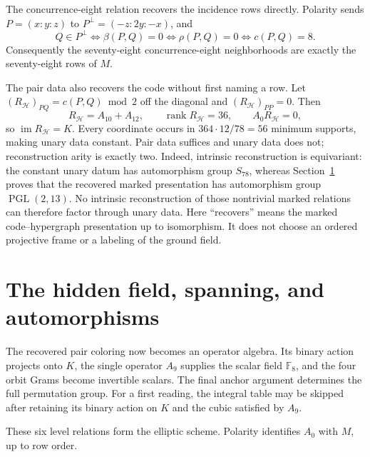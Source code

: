 \documentclass[11pt]{article}
\theoremstyle{definition}
\theoremstyle{remark}
\newcommand{\F}{\mathbb F}
\newcommand{\PGL}{\operatorname{PGL}}
\begin{document}
The concurrence-eight relation recovers the incidence rows directly.
Polarity sends
\(P=(x:y:z)\) to \(P^\perp=(-z:2y:-x)\), and
\[
 Q\in P^\perp
 \iff \beta(P,Q)=0
 \iff \rho(P,Q)=0
 \iff c(P,Q)=8.
\]
Consequently the seventy-eight concurrence-eight neighborhoods are exactly
the seventy-eight rows of \(M\).

The pair data also recovers the code without first naming a row.  Let
\((R_{\mathcal H})_{PQ}=c(P,Q)\bmod2\) off the diagonal and
\((R_{\mathcal H})_{PP}=0\).  Then
\[
 R_{\mathcal H}=A_{10}+A_{12},\qquad
 \operatorname{rank}R_{\mathcal H}=36,
 \qquad A_0R_{\mathcal H}=0,
\]
so \(\operatorname{im}R_{\mathcal H}=K\).  Every coordinate occurs in
\(364\cdot12/78=56\) minimum supports, making unary data constant.  Pair
data suffices and unary data does not; reconstruction arity is exactly two.
Indeed, intrinsic reconstruction is equivariant: the constant unary datum
has automorphism group \(S_{78}\), whereas Section~\ref{sec:hidden-field}
proves that the recovered marked presentation has automorphism group
\(\PGL(2,13)\).  No intrinsic reconstruction of those nontrivial marked
relations can therefore factor through unary data.
Here ``recovers'' means the marked code--hypergraph presentation up to
isomorphism.  It does not choose an ordered projective frame or a labeling of
the ground field.

\section{The hidden field, spanning, and automorphisms}
\label{sec:hidden-field}

The recovered pair coloring now becomes an operator algebra.  Its binary
action projects onto \(K\), the single operator \(A_9\) supplies the scalar
field \(\F_8\), and the four orbit Grams become invertible scalars.  The final
anchor argument determines the full permutation group.  For a first reading,
the integral table may be skipped after retaining its binary action on \(K\)
and the cubic satisfied by \(A_9\).

These six level relations form the elliptic scheme.  Polarity identifies
\(A_0\) with \(M\), up to row order.
\end{document}
